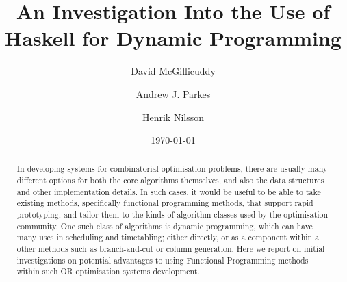 \documentclass[smallextended]{svjour3}       %
\begin{document}
\title{An Investigation Into the Use of Haskell for Dynamic Programming
}


\author{
	David McGillicuddy \and
	Andrew J. Parkes \and
	Henrik Nilsson
}



\date{\today}


\maketitle

\begin{abstract}
In developing systems for combinatorial optimisation problems, 
there are usually many different options for both the core algorithms themselves, 
and also the data structures and other implementation details. 
In such cases, it would be useful to be able to take existing methods, specifically functional programming methods, that support 
rapid prototyping, and tailor them to the kinds of algorithm classes used by the optimisation community.
One such class of algorithms is dynamic programming, which can have many uses in scheduling and timetabling; either directly, or as a component within a other methods such as branch-and-cut or column generation.
Here we report on initial investigations on potential advantages to using Functional Programming methods within such OR optimisation systems development.



\end{abstract}
\end{document}
